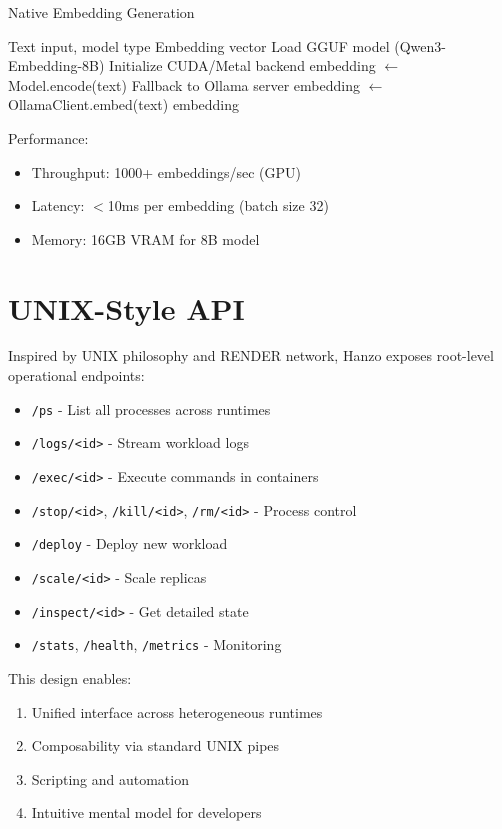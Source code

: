 \documentclass[11pt,twocolumn]{article}
\begin{document}
\begin{algorithm}
\caption{Native Embedding Generation}
\begin{algorithmic}[1]
\REQUIRE Text input, model type
\ENSURE Embedding vector
    \STATE Load GGUF model (Qwen3-Embedding-8B)
        \STATE Initialize CUDA/Metal backend
    \ENDIF
    \STATE embedding $\leftarrow$ Model.encode(text)
        \STATE Fallback to Ollama server
    \ENDIF
\ELSE
    \STATE embedding $\leftarrow$ OllamaClient.embed(text)
\ENDIF
\RETURN embedding
\end{algorithmic}
\end{algorithm}

Performance:
\begin{itemize}
\item Throughput: 1000+ embeddings/sec (GPU)
\item Latency: $<$10ms per embedding (batch size 32)
\item Memory: 16GB VRAM for 8B model
\end{itemize}

\section{UNIX-Style API}

Inspired by UNIX philosophy and RENDER network, Hanzo exposes root-level operational endpoints:

\begin{itemize}
\item \texttt{/ps} - List all processes across runtimes
\item \texttt{/logs/<id>} - Stream workload logs
\item \texttt{/exec/<id>} - Execute commands in containers
\item \texttt{/stop/<id>}, \texttt{/kill/<id>}, \texttt{/rm/<id>} - Process control
\item \texttt{/deploy} - Deploy new workload
\item \texttt{/scale/<id>} - Scale replicas
\item \texttt{/inspect/<id>} - Get detailed state
\item \texttt{/stats}, \texttt{/health}, \texttt{/metrics} - Monitoring
\end{itemize}

This design enables:
\begin{enumerate}
\item Unified interface across heterogeneous runtimes
\item Composability via standard UNIX pipes
\item Scripting and automation
\item Intuitive mental model for developers
\end{enumerate}
\end{document}
